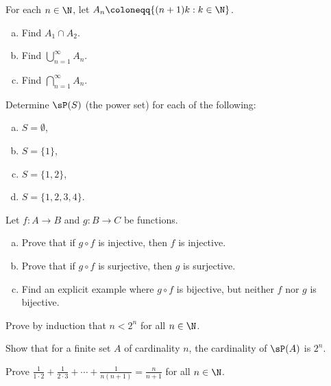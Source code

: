 \begin{exercise}
For each $n \in \N$, let $A_n \coloneqq \{ (n+1)k : k \in \N \}$.
\begin{enumerate}[a)]
\item Find $A_1 \cap A_2$.
\item Find $\bigcup_{n=1}^\infty A_n$.
\item Find $\bigcap_{n=1}^\infty A_n$.
\end{enumerate}
\end{exercise}

\begin{samepage}
\begin{exercise}
Determine $\sP(S)$ (the power set) for each of the following:
\begin{enumerate}[a)]
\item $S = \emptyset$,
\item $S = \{1\}$,
\item $S = \{1,2\}$,
\item $S = \{1,2,3,4\}$.
\end{enumerate}
\end{exercise}
\end{samepage}


\begin{exercise}
Let $f \colon A \to B$ and $g \colon B \to C$ be functions.
\begin{enumerate}[a)]
\item
Prove that if $g \circ f$ is injective, then $f$ is injective.
\item
Prove that if $g \circ f$ is surjective, then $g$ is surjective.
\item
Find an explicit example where $g \circ f$ is bijective, but neither $f$
nor $g$ is bijective.
\end{enumerate}
\end{exercise}

\begin{exercise}
\pagebreak[2]
Prove by induction that $n < 2^n$ for all $n \in \N$.
\end{exercise}

\begin{exercise}
Show that for a finite set $A$ of cardinality $n$, the cardinality
of $\sP(A)$ is $2^n$.
\end{exercise}

\begin{exercise}
Prove $\frac{1}{1\cdot 2} + 
\frac{1}{2\cdot 3} + \cdots + \frac{1}{n(n+1)} = \frac{n}{n+1}$
for all $n \in \N$.
\end{exercise}

